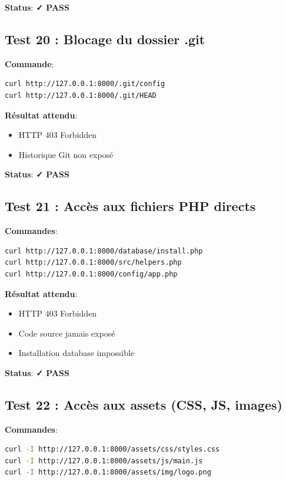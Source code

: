 \documentclass[11pt,a4paper,french]{report}
\newcommand{\pass}{\cellcolor{pass}\textbf{\color{white}✓ PASS}}
\begin{document}
\textbf{Status}: \pass

\subsection{Test 20 : Blocage du dossier .git}

\textbf{Commande}:
\begin{lstlisting}[language=bash]
curl http://127.0.0.1:8000/.git/config
curl http://127.0.0.1:8000/.git/HEAD
\end{lstlisting}

\textbf{Résultat attendu}:
\begin{itemize}
    \item HTTP 403 Forbidden
    \item Historique Git non exposé
\end{itemize}

\textbf{Status}: \pass

\subsection{Test 21 : Accès aux fichiers PHP directs}

\textbf{Commandes}:
\begin{lstlisting}[language=bash]
curl http://127.0.0.1:8000/database/install.php
curl http://127.0.0.1:8000/src/helpers.php
curl http://127.0.0.1:8000/config/app.php
\end{lstlisting}

\textbf{Résultat attendu}:
\begin{itemize}
    \item HTTP 403 Forbidden
    \item Code source jamais exposé
    \item Installation database impossible
\end{itemize}

\textbf{Status}: \pass

\subsection{Test 22 : Accès aux assets (CSS, JS, images)}

\textbf{Commandes}:
\begin{lstlisting}[language=bash]
curl -I http://127.0.0.1:8000/assets/css/styles.css
curl -I http://127.0.0.1:8000/assets/js/main.js
curl -I http://127.0.0.1:8000/assets/img/logo.png
\end{lstlisting}
\end{document}
